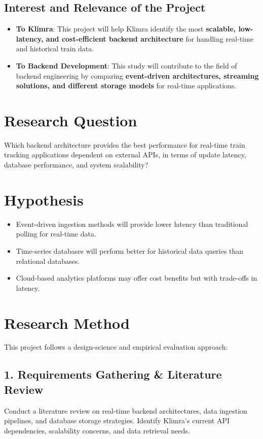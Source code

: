 \documentclass[a4paper,12pt]{article}
\begin{document}
\subsection{Interest and Relevance of the Project}
\begin{itemize}
    \item \textbf{To Klimra}: This project will help Klimra identify the most \textbf{scalable, low-latency, and cost-efficient backend architecture} for handling real-time and historical train data.
    \item \textbf{To Backend Development}: This study will contribute to the field of backend engineering by comparing \textbf{event-driven architectures, streaming solutions, and different storage models} for real-time applications.
\end{itemize}

\section{Research Question}
Which backend architecture provides the best performance for real-time train tracking applications dependent on external APIs, in terms of update latency, database performance, and system scalability?

\section{Hypothesis}
\begin{itemize}
    \item Event-driven ingestion methods will provide lower latency than traditional polling for real-time data.
    \item Time-series databases will perform better for historical data queries than relational databases.
    \item Cloud-based analytics platforms may offer cost benefits but with trade-offs in latency.
\end{itemize}

\section{Research Method}
This project follows a design-science and empirical evaluation approach:

\subsection*{1. Requirements Gathering \& Literature Review}
Conduct a literature review on real-time backend architectures, data ingestion pipelines, and database storage strategies. Identify Klimra’s current API dependencies, scalability concerns, and data retrieval needs.
\end{document}

